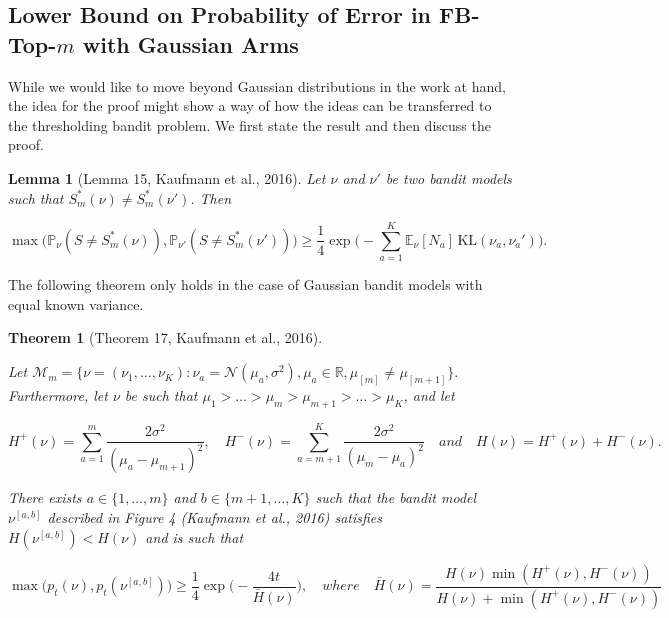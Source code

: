 \documentclass[11pt,]{article}
\newtheorem{theorem}{Theorem}
\newtheorem{lemma}{Lemma}
\newcommand{\KL}{\,\text{KL}}
\begin{document}
\subsection{\texorpdfstring{Lower Bound on Probability of Error in
FB-Top-\(m\) with Gaussian Arms
\label{sec:KaufmannLBTopMGaussian}}{Lower Bound on Probability of Error in FB-Top-m with Gaussian Arms }}\label{lower-bound-on-probability-of-error-in-fb-top-m-with-gaussian-arms}

While we would like to move beyond Gaussian distributions in the work at
hand, the idea for the proof might show a way of how the ideas can be
transferred to the thresholding bandit problem. We first state the
result and then discuss the proof.

\begin{lemma}[Lemma 15, Kaufmann et al., 2016] \label{theorem:KaufmannEtAlLemma15}
Let $\nu$ and $\nu'$ be two bandit models such that $S^*_m(\nu) \neq S^*_m(\nu')$. Then

\begin{equation*}
\max \big( \mathbb{P}_{\nu}(S \neq S^*_m(\nu)), \mathbb{P}_{\nu'}(S \neq S^*_m(\nu')) \big) \geq \frac{1}{4} \exp \Big(-\sum_{a=1}^{K} \mathbb{E}_{\nu}[N_a] \KL(\nu_a, \nu_a') \Big).
\end{equation*}
\end{lemma}

The following theorem only holds in the case of Gaussian bandit models
with equal known variance.

\begin{theorem}[Theorem 17, Kaufmann et al., 2016] \label{theorem:KaufmannEtAlTheorem17}

Let $\mathcal{M}_m = \{\nu = (\nu_1, \dots, \nu_K): \nu_a = \mathcal{N}(\mu_a, \sigma^2), \mu_a \in \mathbb{R}, \mu_{[m]}\neq \mu_{[m+1]}\}.$ Furthermore, let $\nu$ be such that $\mu_1 > \dots > \mu_m > \mu_{m+1} > \dots > \mu_K$, and let

\begin{equation*}
H^+(\nu) = \sum_{a=1}^m \frac{2\sigma^2}{(\mu_a - \mu_{m+1})^2}, \quad H^-(\nu) = \sum_{a=m+1}^K \frac{2\sigma^2}{(\mu_m - \mu_a)^2} \quad
and \quad
H(\nu) = H^+(\nu) + H^-(\nu).
\end{equation*}

There exists $a \in \{1, \dots, m\}$ and $b \in \{m+1, \dots, K\}$ such that the bandit model $\nu^{[a,b]}$ described in Figure 4 (Kaufmann et al., 2016) satisfies $H(\nu^{[a,b]}) < H(\nu)$ and is such that

\begin{equation*}
\max \big( p_t(\nu),p_t(\nu^{[a,b]})\big) \geq \frac{1}{4} \exp \big(-\frac{4t}{\bar{H}(\nu)}\big), \quad where \quad \bar{H}(\nu) = \frac{H(\nu) \min(H^+(\nu),H^-(\nu))}{H(\nu)+\min(H^+(\nu),H^-(\nu))}
\end{equation*}
\end{theorem}
\end{document}
